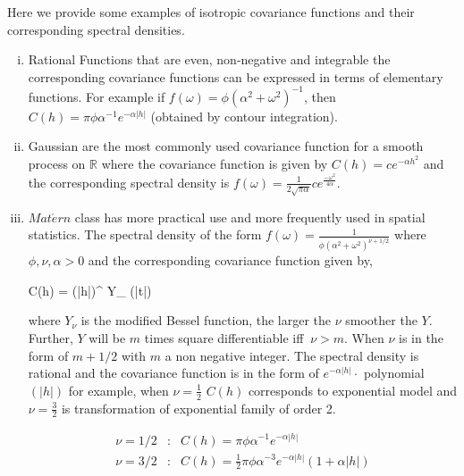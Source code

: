 Here we provide some examples of isotropic covariance functions and their corresponding spectral densities.
\begin{enumerate}[(i)]
	\item Rational Functions that are even,  non-negative and integrable the corresponding covariance functions can be expressed in terms of elementary functions. For example if $f(\omega) =\phi (\alpha^2+\omega^2)^{-1}$, then $C(h) = \pi\phi\alpha^{-1}e^{-\alpha|h|}$ (obtained by contour integration).
	
	\item Gaussian are the most commonly used covariance function for a smooth process on $\mathbb{R}$ where the covariance function is given by $C(h)=ce^{-\alpha h^2}$ and the corresponding spectral density is $ f(\omega) = \frac{1}{2\sqrt{\pi\alpha}}c e^{\frac{-\omega^2}{4\alpha}}$.

	
	\item $Mat\acute{e}rn$ class has more practical use and more frequently used in spatial statistics. The spectral density of the form $f(\omega) =\frac{1}{\phi(\alpha^2+\omega^2)^{\nu+1/2}}$ where $\phi,\nu,\alpha>0$ and the corresponding covariance function given by,
	
	      \beq
	      C(h) =  (\alpha|h|)^{\nu} Y_{\nu} (\alpha|t|)
	      \eeq
	
	      where $Y_{\nu}$ is the modified Bessel function, the larger the $\nu$ smoother the $Y$. Further, $Y$ will be $m$ times square differentiable iff $\ \nu>m$. When $\nu$ is in the form of $m+1/2$ with $m$ a non negative integer. The spectral density is rational and the covariance function is in the form of $e^{-\alpha|h|}\cdot$ polynomial$(|h|)$ for example, when $\nu=\frac{1}{2}$ $C(h)$ corresponds to exponential model and $\nu=\frac{3}{2}$ is transformation of exponential family of order 2.
	
	      \begin{eqnarray*}
	      	\nu = 1/2 &:& C(h) = \pi\phi\alpha^{-1}e^{-\alpha|h|}\\
	      	\nu = 3/2 &:& C(h) = \frac{1}{2}\pi\phi\alpha^{-3}e^{-\alpha|h|}(1+\alpha|h|)\\
	      \end{eqnarray*}
	
\end{enumerate}

